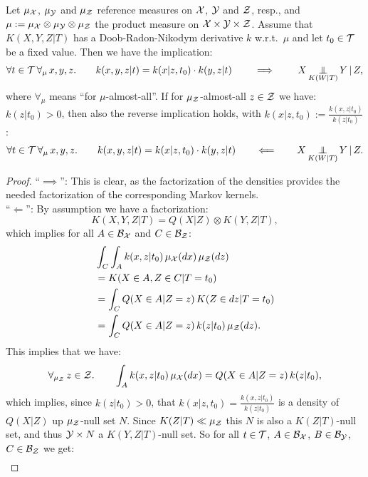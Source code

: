 \begin{Thm}
    Let $\mu_{\mathcal{X}}$, $\mu_{\mathcal{Y}}$ and $\mu_{\mathcal{Z}}$ reference measures on $\mathcal{X}$, $\mathcal{Y}$ and $\mathcal{Z}$, resp., and $\mu:=\mu_{\mathcal{X}} \otimes \mu_{\mathcal{Y}} \otimes \mu_{\mathcal{Z}}$ the product measure on
    $\mathcal{X}\times\mathcal{Y}\times\mathcal{Z}$. Assume that $K(X,Y,Z|T)$ has a Doob-Radon-Nikodym derivative $k$ w.r.t.\ $\mu$ and let $t_0 \in \mathcal{T}$ be a fixed value.
    Then we have the implication:
    \[\forall t \in \mathcal{T}\, \forall_\mu\, x,y,z. \qquad k(x,y,z|t) = k(x|z,t_0) \cdot k(y,z|t) \qquad \implies \qquad X \operatorname*{\perp\mkern-11mu\perp}_{K(W|T)} Y \operatorname*{|} Z, \]
    where $\forall_\mu$ means ``for $\mu$-almost-all''. If for $\mu_{\mathcal{Z}}$-almost-all $z \in \mathcal{Z}$ we have: $k(z|t_0)>0$, then also the reverse implication holds, with $k(x|z,t_0) := \frac{k(x,z|t_0)}{k(z|t_0)}$:
    \[\forall t \in \mathcal{T}\, \forall_\mu\, x,y,z. \qquad k(x,y,z|t) = k(x|z,t_0) \cdot k(y,z|t) \qquad \Longleftarrow \qquad X \operatorname*{\perp\mkern-11mu\perp}_{K(W|T)} Y \operatorname*{|} Z. \]
    \begin{proof}
        ``$\implies$'': This is clear, as the factorization of the densities provides the needed factorization of the corresponding Markov kernels.\\
    ``$\Longleftarrow$'': By assumption we have a factorization:
    \[ K(X,Y,Z|T) = Q(X|Z) \otimes K(Y,Z|T),  \]
    which implies for all $A \in \mathcal{B}_{\mathcal{X}}$ and $C \in \mathcal{B}_{\mathcal{Z}}$:
    \begin{align*} 
        &\int_C \int_A k(x,z|t_0) \, \mu_{\mathcal{X}}(dx)\, \mu_{\mathcal{Z}}(dz) \\
        &=  K(X \in A,Z \in C|T=t_0) \\ 
        &= \int_C Q(X \in A|Z=z)\,K(Z \in dz|T=t_0)  \\ 
        &= \int_C Q(X \in A|Z=z)\,k(z|t_0)\, \mu_{\mathcal{Z}}(dz). 
    \end{align*}
    This implies that we have:
    \begin{align*} 
        \forall_{\mu_{\mathcal{Z}}}\, z \in \mathcal{Z}.\qquad   \int_A k(x,z|t_0) \, \mu_{\mathcal{X}}(dx)  =  Q(X \in A|Z=z)\,k(z|t_0), 
    \end{align*}
    which implies, since $k(z|t_0) > 0$, that $k(x|z,t_0) = \frac{k(x,z|t_0)}{k(z|t_0)}$ is a density of $Q(X|Z)$ up $\mu_{\mathcal{Z}}$-null set $N$.
    Since $K(Z|T) \ll \mu_{\mathcal{Z}}$ this $N$ is also a $K(Z|T)$-null set, and thus $\mathcal{Y} \times N$ a $K(Y,Z|T)$-null set. 
    So for all $t \in \mathcal{T}$, $A \in \mathcal{B}_{\mathcal{X}}$, $B \in \mathcal{B}_{\mathcal{Y}}$, $C \in \mathcal{B}_{\mathcal{Z}}$ we get:
        \begin{align*} 

\end{align*}
\end{proof}
\end{Thm}
